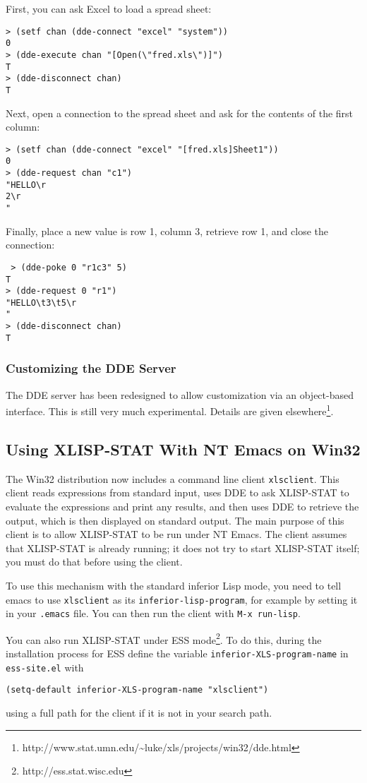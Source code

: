 \documentclass[11pt]{article}
\newcommand{\htmladdnormallinkfoot}[2]{{#1}\footnote{#2}}
\begin{document}
First, you can ask Excel to load a spread sheet:
\begin{verbatim}
> (setf chan (dde-connect "excel" "system"))
0 
> (dde-execute chan "[Open(\"fred.xls\")]")
T
> (dde-disconnect chan)
T
\end{verbatim}
Next, open a connection to the spread sheet and ask for the contents
of the first column:
\begin{verbatim}
> (setf chan (dde-connect "excel" "[fred.xls]Sheet1"))
0
> (dde-request chan "c1")
"HELLO\r
2\r
"
\end{verbatim}
Finally, place a new value is row 1, column 3, retrieve row 1, and
close the connection:
\begin{verbatim}
 > (dde-poke 0 "r1c3" 5)
T
> (dde-request 0 "r1")
"HELLO\t3\t5\r
"
> (dde-disconnect chan)
T 
\end{verbatim}

\subsubsection{Customizing the DDE Server}
The DDE server has been redesigned to allow customization via an
object-based interface.  This is still very much experimental.
Details are given
\htmladdnormallinkfoot{elsewhere}{http://www.stat.umn.edu/\~{}luke/xls/projects/win32/dde.html}.

\subsection{Using XLISP-STAT With NT Emacs on Win32}
The Win32 distribution now includes a command line client
\texttt{xlsclient}.  This client reads expressions from standard
input, uses DDE to ask XLISP-STAT to evaluate the expressions and
print any results, and then uses DDE to retrieve the output, which is
then displayed on standard output.  The main purpose of this client is
to allow XLISP-STAT to be run under NT Emacs.  The client assumes that
XLISP-STAT is already running; it does not try to start XLISP-STAT
itself; you must do that before using the client.

To use this mechanism with the standard inferior Lisp mode, you need
to tell emacs to use \texttt{xlsclient} as its
\texttt{inferior-lisp-program}, for example by setting it in your
\texttt{.emacs} file.  You can then run the client with \texttt{M-x
run-lisp}.

You can also run XLISP-STAT under \htmladdnormallinkfoot{ESS
  mode}{http://ess.stat.wisc.edu}.  To do this, during the
installation process for ESS define the variable
\texttt{inferior-XLS-program-name} in \texttt{ess-site.el} with
\begin{verbatim}
(setq-default inferior-XLS-program-name "xlsclient")
\end{verbatim}
using a full path for the client if it is not in your search path.
\end{document}
